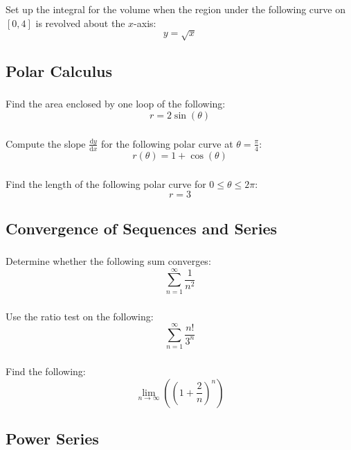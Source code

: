\documentclass[12pt]{article}
\newcommand{\dd}{\text{d}}
\begin{document}
			\subsubsection{}
				Set up the integral for the volume when the region under the following curve on \([0,4]\) is revolved about the \(x\)-axis:
				\[y=\sqrt{x}\]

		\subsection{Polar Calculus}
			\subsubsection{}
				Find the area enclosed by one loop of the following:
				\[r=2\sin\left(\theta\right)\]
			\subsubsection{}
				Compute the slope \(\frac{\dd y}{\dd x}\) for the following polar curve at \(\theta=\frac{\pi}{4}\):
				\[r(\theta)=1+\cos\left(\theta\right)\]
			\subsubsection{}
				Find the length of the following polar curve for \(0\le\theta\le2\pi\):
				\[r=3\]

		\subsection{Convergence of Sequences and Series}
			\subsubsection{}
				Determine whether the following sum converges:
				\[\sum_{n=1}^\infty{\frac{1}{n^2}}\]
			\subsubsection{}
				Use the ratio test on the following:
				\[\sum_{n=1}^\infty{\frac{n!}{3^n}}\]
			\subsubsection{}
				Find the following:
				\[\lim_{n\to\infty}\left(\left(1+\frac{2}{n}\right)^n\right)\]

		\subsection{Power Series}
\end{document}

